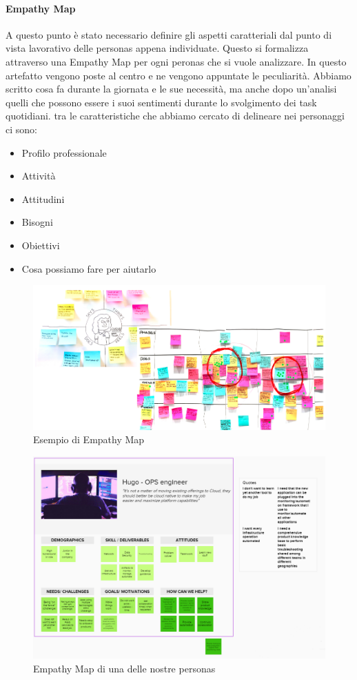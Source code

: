 \paragraph{Empathy Map}
A questo punto è stato necessario definire gli aspetti caratteriali dal punto di vista lavorativo delle personas appena individuate. Questo si formalizza attraverso una Empathy Map per ogni peronas che si vuole analizzare. In questo artefatto vengono poste al centro e ne vengono appuntate le peculiarità. Abbiamo scritto cosa fa durante la giornata e le sue necessità, ma anche dopo un'analisi quelli che possono essere i suoi sentimenti durante lo svolgimento dei task quotidiani. tra le caratteristiche che abbiamo cercato di delineare nei personaggi ci sono:
\begin{itemize}
	\item Profilo professionale
	\item Attività
	\item Attitudini
	\item Bisogni
	\item Obiettivi
	\item Cosa possiamo fare per aiutarlo
\end{itemize}
\begin{figure} [h!]
	\centering
	\includegraphics[width=0.7\linewidth]{capitoli/imgs/empatymap}
	\caption{Esempio di Empathy Map}
	\label{fig:empatymap}
\end{figure}
\begin{figure} [h!]
	\centering
	\includegraphics[width=0.7\linewidth]{capitoli/imgs/HugoEM.PNG}
	\caption{Empathy Map di una delle nostre personas}
	\label{fig:hugoem}
\end{figure}


